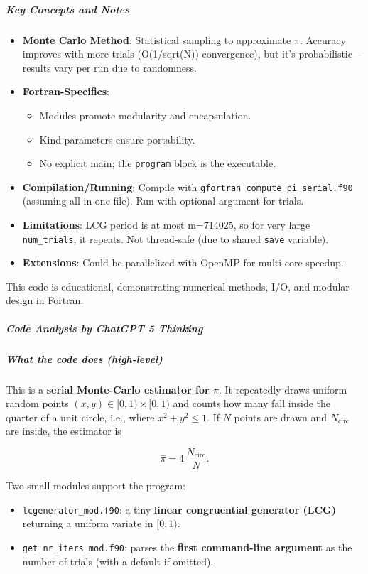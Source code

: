 \subparagraph{Key Concepts and Notes}

\begin{itemize}
\item \textbf{Monte Carlo Method}: Statistical sampling to approximate $\pi$. Accuracy improves with more trials (O(1/sqrt(N)) convergence), but it's probabilistic---results vary per run due to randomness.
\item \textbf{Fortran-Specifics}:

\begin{itemize}
\item Modules promote modularity and encapsulation.
\item Kind parameters ensure portability.
\item No explicit main; the \texttt{program} block is the executable.
\end{itemize}


\item \textbf{Compilation/Running}: Compile with \texttt{gfortran compute\_pi\_serial.f90} (assuming all in one file). Run with optional argument for trials.
\item \textbf{Limitations}: LCG period is at most m=714025, so for very large \texttt{num\_trials}, it repeats. Not thread-safe (due to shared \texttt{save} variable).
\item \textbf{Extensions}: Could be parallelized with OpenMP for multi-core speedup.
\end{itemize}

This code is educational, demonstrating numerical methods, I/O, and modular design in Fortran.

\subparagraph{Code Analysis by ChatGPT 5 Thinking}

\subparagraph{What the code does (high-level)}

This is a \textbf{serial Monte-Carlo estimator for $\pi$}. It repeatedly draws uniform random points $(x,y)\in[0,1)\times[0,1)$ and counts how many fall inside the quarter of a unit circle, i.e., where $x^2+y^2\le 1$. If $N$ points are drawn and $N_{\text{circ}}$ are inside, the estimator is

\begin{equation}
\widehat{\pi}=4\,\frac{N_{\text{circ}}}{N}.
\end{equation}

Two small modules support the program:

\begin{itemize}
\item \texttt{lcgenerator\_mod.f90}: a tiny \textbf{linear congruential generator (LCG)} returning a uniform variate in $[0,1)$.
\item \texttt{get\_nr\_iters\_mod.f90}: parses the \textbf{first command-line argument} as the number of trials (with a default if omitted).
\end{itemize}

